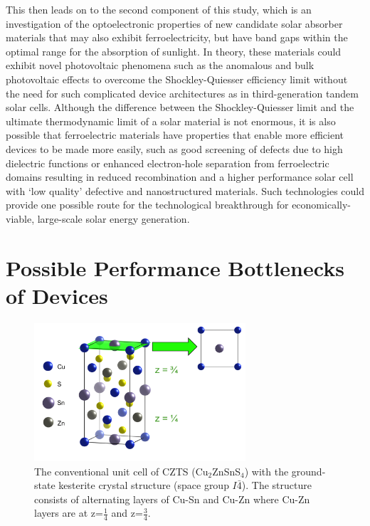 This then leads on to the second component of this study, which is an investigation of the optoelectronic properties of new candidate solar absorber materials that may also exhibit ferroelectricity, but have band gaps within the optimal range for the absorption of sunlight. 
In theory, these materials 
could exhibit novel photovoltaic phenomena such as the anomalous and bulk photovoltaic effects to overcome the Shockley-Quiesser efficiency limit without the need for such complicated device architectures as in third-generation tandem solar cells. Although the difference between the Shockley-Quiesser limit and the ultimate thermodynamic limit of a solar material is not enormous, it is also possible that ferroelectric materials have properties that enable more efficient devices to be made more easily, such as good screening of defects due to high dielectric functions or enhanced electron-hole separation from ferroelectric domains resulting in reduced recombination and a higher performance solar cell with `low quality' defective and nanostructured materials. Such technologies could provide one possible route for the technological breakthrough for economically-viable, large-scale solar energy generation.

\section{Possible Performance Bottlenecks of {\CZTS } Devices}\label{bottlenecks}

\begin{figure}[h!]
  \centering
    \includegraphics[width=0.7\textwidth]{figures/CZTS_cell.png}
    \caption{The conventional unit cell of CZTS (Cu$_{2}$ZnSnS$_{4}$) with the ground-state kesterite crystal structure (space group $I\bar{4}$). The structure consists of alternating layers of Cu-Sn and Cu-Zn where Cu-Zn layers are at z=$\frac{1}{4}$ and z=$\frac{3}{4}$.}
  \label{CZTS_cell}
\end{figure}


